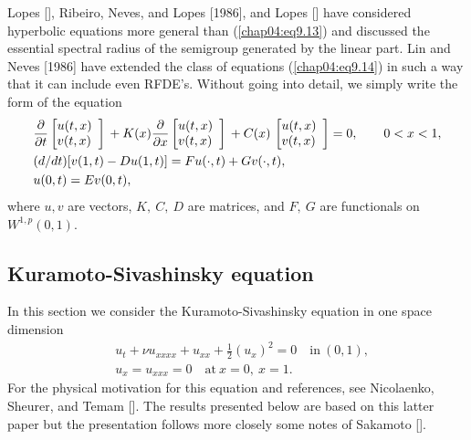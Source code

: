 \documentclass{surv-l}
\theoremstyle{plain}
\theoremstyle{definition}
\numberwithin{equation}{section}
\numberwithin{figure}{chapter}
\begin{document}
Lopes [\citeyear{1984l}], Ribeiro, Neves, and Lopes [1986], and Lopes [\citeyear{1988l}] have considered hyperbolic equations more general than (\ref{chap04:eq9.13}) and discussed the essential spectral radius of the semigroup generated by the linear part. Lin and Neves [1986] have extended the class of equations (\ref{chap04:eq9.14}) in such a way that it can include even RFDE's. Without going into detail, we simply write the form of the equation
\begin{align*}
& \frac{\partial}{\partial t} \left[\begin{array}{@{}ll@{}}
u(t, x)\\
v(t, x)
\end{array}\right]\,+K(x)\frac{\partial}{\partial x} \left[\begin{array}{@{}ll@{}}
u(t,x)\\
v(t,x)
\end{array}\right]\,+C(x)\,\left[\begin{array}{@{}ll@{}}
u(t, x)\\
v(t, x)
\end{array}\right]=0,\qquad 0<x<1,\\
& (d/dt)[v(1, t)-Du(1, t)]=Fu(\cdot, t)+Gv(\cdot, t),\\
& u(0, t)=Ev(0, t),
\end{align*}
where $u, v$ are vectors, $K,\ C,\ D$ are matrices, and $F,\ G$ are functionals on $W^{1,p}(0,1)$.

\subsection{Kuramoto-Sivashinsky equation}\label{subsec4.9.5} In this section we consider the Kuramoto-Sivashinsky equation in one space dimension
\begin{align}\label{chap04:eq9.16}
& u_{t}+\nu u_{xxxx}+u_{xx}+{\textstyle\frac{1}{2}}(u_{x})^{2}=0\quad \mathrm{in}\ (0,1),\\
& u_{x}=u_{xxx}=0\quad \mathrm{at}\ x=0,\ x=1.\label{chap04:eq9.17}
\end{align}
For the physical motivation for this equation and references, see Nicolaenko, Sheurer, and Temam [\citeyear{1985nst}]. The results presented below are based on this latter paper but the presentation follows more closely some notes of Sakamoto [\citeyear{1987s}].
\end{document}
